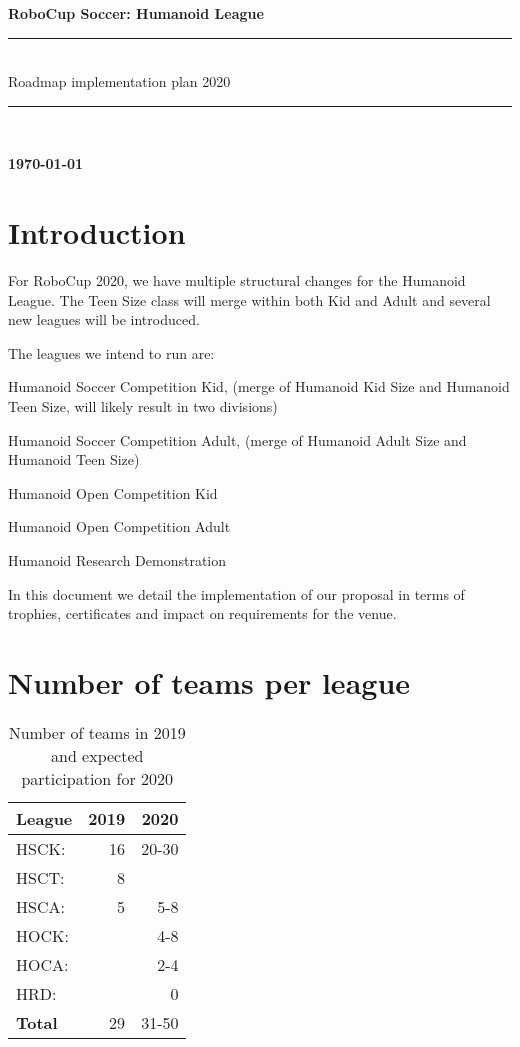 \documentclass{article}
\begin{document}
\begin{center}
  {\Huge \bfseries
    RoboCup Soccer: Humanoid League
    \\
    \rule{\textwidth}{0.1cm}\\
    \vspace{0.5cm}
    Roadmap implementation plan 2020\\
    \vspace{0.5cm}
    \rule{\textwidth}{0.1cm}\\
  }
  {\bfseries \today}
\end{center}

\newpage

\section{Introduction}

For RoboCup 2020, we have multiple structural changes for the Humanoid League.
The Teen Size class will merge within both Kid and Adult and several new leagues
will be introduced.

The leagues we intend to run are:

\begin{description}[leftmargin=5em,style=nextline]
\item[HSCK:] Humanoid Soccer Competition Kid, (merge of Humanoid Kid Size and
  Humanoid Teen Size, will likely result in two divisions)
\item[HSCA:] Humanoid Soccer Competition Adult, (merge of Humanoid Adult Size
  and Humanoid Teen Size)
\item[HOCK:] {Humanoid Open Competition Kid}
\item[HOCA:] {Humanoid Open Competition Adult}
\item[HRD:] {Humanoid Research Demonstration}
\end{description}

In this document we detail the implementation of our proposal in terms of
trophies, certificates and impact on requirements for the venue.

\section{Number of teams per league}

\begin{table}[h]
  \centering
  \caption{\label{tab:nb_teams}Number of teams in 2019 and expected
    participation for 2020}
  \begin{tabular}{l | r | r}
    League & 2019 & 2020\\
    \hline
    HSCK: & 16 & 20-30\\ 
    HSCT: & 8 & \\ 
    HSCA: & 5 & 5-8\\ 
    HOCK: &  & 4-8\\
    HOCA: &  & 2-4\\ 
    HRD: &  & 0\\
    \hline
    \textbf{Total} & 29 & 31-50
  \end{tabular}
\end{table}
\end{document}

